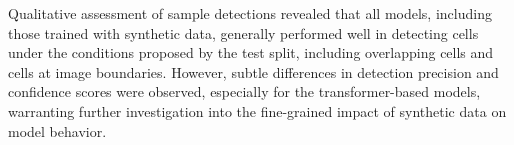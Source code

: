 Qualitative assessment of sample detections revealed that all models, including those trained with synthetic data, generally performed well in detecting cells under the conditions proposed by the test split, including overlapping cells and cells at image boundaries.
However, subtle differences in detection precision and confidence scores were observed, especially for the transformer-based models, warranting further investigation into the fine-grained impact of synthetic data on model behavior.
\begin{table}[h!]
    \centering
    \caption{Detailed comparison of the performance metrics for all evaluated models across the different training datasets.}
    \label{tab:model-performances}
\end{table}
